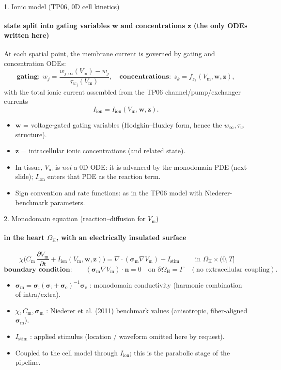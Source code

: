 \documentclass[aspectratio=169,10pt]{beamer}
\newcommand{\Vm}{V_{\mathrm m}}
\newcommand{\Iion}{I_{\mathrm{ion}}}
\newcommand{\Istim}{I_{\mathrm{stim}}}
\newcommand{\Cm}{C_{\mathrm m}}
\newcommand{\sm}{\bm\sigma_{\mathrm m}}
\newcommand{\si}{\bm\sigma_{\mathrm i}}
\newcommand{\se}{\bm\sigma_{\mathrm e}}
\newcommand{\OH}{\Omega_{\mathrm H}}
\newcommand{\nn}{\mathbf n}
\newcommand{\ww}{\bm w}
\newcommand{\zz}{\bm z}
\begin{document}
\begin{frame}{1. Ionic model (TP06, 0D cell kinetics)}
\framesubtitle{state split into gating variables $\ww$ and concentrations $\zz$ (the only ODEs written here)}
At each spatial point, the membrane current is governed by gating and concentration ODEs:
\[
\textbf{gating:}\ \ \dot w_j=\frac{w_{j,\infty}(\Vm)-w_j}{\tau_{w_j}(\Vm)},
\quad
\textbf{concentrations:}\ \ \dot z_k=f_{z_k}(\Vm,\ww,\zz),
\]
with the total ionic current assembled from the TP06 channel/pump/exchanger currents
\[
\Iion=\Iion(\Vm,\ww,\zz).
\]
\begin{itemize}\itemsep0.3em
  \item $\ww$ = voltage-gated gating variables (Hodgkin--Huxley form, hence the $w_\infty,\tau_w$ structure).
  \item $\zz$ = intracellular ionic concentrations (and related state).
  \item In tissue, $\Vm$ is \emph{not} a 0D ODE: it is advanced by the monodomain PDE (next slide); $\Iion$ enters that PDE as the reaction term.
  \item Sign convention and rate functions: as in the TP06 model with Niederer-benchmark parameters.
\end{itemize}
\end{frame}

\begin{frame}{2. Monodomain equation (reaction--diffusion for $\Vm$)}
\framesubtitle{in the heart $\OH$, with an electrically insulated surface}
\[
\boxed{\;\chi\Big(\Cm\,\frac{\partial \Vm}{\partial t}+\Iion(\Vm,\ww,\zz)\Big)
=\nabla\!\cdot(\sm\nabla \Vm)+\Istim\;}\qquad\text{in }\OH\times(0,T]
\]
\[
\textbf{boundary condition:}\qquad (\sm\nabla \Vm)\cdot\nn=0 \quad\text{on }\partial\OH=\Gamma
\quad(\text{no extracellular coupling}).
\]
\begin{itemize}\itemsep0.3em
  \item $\sm=\si(\si+\se)^{-1}\se$ : monodomain conductivity (harmonic combination of intra/extra).
  \item $\chi,\Cm,\sm$ : Niederer et al. (2011) benchmark values (anisotropic, fiber-aligned $\sm$).
  \item $\Istim$ : applied stimulus (location / waveform omitted here by request).
  \item Coupled to the cell model through $\Iion$; this is the parabolic stage of the pipeline.
\end{itemize}
\end{frame}
\end{document}
